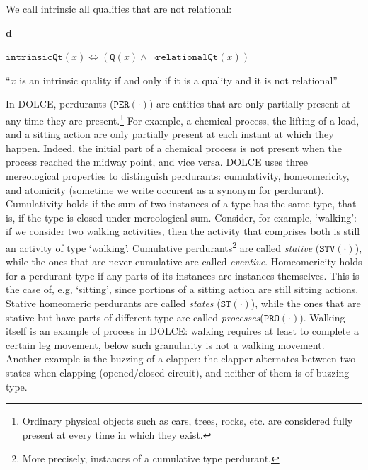 \documentclass[sw]{iosart2x}
\newcommand{\bflist}{\begin{list}{}{\setlength{\topsep}{2mm}\setlength{\partopsep}{0mm}\setlength{\parsep}{0mm}\setlength{\leftmargin}{9mm}\setlength{\labelwidth}{8mm}}}
\newcommand{\eflist}{\end{list}}
\newcommand{\DefLabel}{\textrm{d}}
\newcounter{cntdef}
\newcommand{\mydf}[1]{\refstepcounter{cntdef}\begin{small}{\bf \DefLabel\thecntdef\label{def:#1}}\end{small}}
\newcommand{\mytext}[1]{``#1''}
\newcommand{\generalStyle}[1]{\texttt{#1}}
\newcommand{\uniRel}[2]{\generalStyle{#1}(#2)}
\newcommand{\myiff}{\Longleftrightarrow}
\newcommand{\DOLCE}{\textsc{DOLCE}\xspace} %
\newcommand{\DOLCEQuality}[1]{\uniRel{Q}{#1}}
\newcommand{\DOLCEState}[1]{\uniRel{{ST}}{#1}}
\newcommand{\DOLCEProcess}[1]{\uniRel{PRO}{#1}}
\newcommand{\DOLCEPerdurant}[1]{\uniRel{{PER}}{#1}}
\newcommand{\DOLCEStative}[1]{\uniRel{{STV}}{#1}}
\newcommand{\RelationalQuality}[1]{\uniRel{relationalQt}{#1}}
\newcommand{\IntrinsicQuality}[1]{\uniRel{intrinsicQt}{#1}}
\newcommand{\firstTimeKeyWord}[1]{\textit{#1}}
\newcommand{\quotes}[1]{`#1'}
\begin{document}
We call intrinsic all qualities that are not relational:
\bflist
  \item[\mydf{intrinsicQtPartialDef}] $ \IntrinsicQuality{x} \myiff  ( \DOLCEQuality{x} \land \neg  \RelationalQuality{x})$
  \item[] \mytext{$x$ is an intrinsic quality if and only if it is a quality and it is not relational}
\eflist

In \DOLCE, perdurants ($\DOLCEPerdurant{\cdot}$) are entities that are only partially present at any time they are present.\footnote{Ordinary physical objects such as cars, trees, rocks, etc. are considered fully present at every time in which they exist.} For example, a chemical process, the lifting of a load, and a sitting action are only partially present at each instant at which they happen. Indeed, the initial part of a chemical process is not present when the process reached the midway point, and vice versa.  %
\DOLCE uses three mereological properties to distinguish perdurants: cumulativity, homeomericity, and atomicity (sometime we write occurent as a synonym for perdurant).
Cumulativity holds if the sum of two instances of a type has the same type, that is, if the type is closed under mereological sum. Consider, for example, \quotes{walking}: if we consider two walking activities, then the activity that comprises both is still an activity of type \quotes{walking}.
Cumulative perdurants\footnote{More precisely, instances of a cumulative type perdurant.} are called \firstTimeKeyWord{stative} ($\DOLCEStative{\cdot}$), while the ones that are never cumulative are called \firstTimeKeyWord{eventive}.
Homeomericity holds for a perdurant type if any parts of its instances are instances themselves.
This is the case of, e.g, \quotes{sitting}, since portions of a sitting action are still sitting actions.
Stative homeomeric perdurants are called \firstTimeKeyWord{states} ($\DOLCEState{\cdot}$), while the ones that are stative but have parts of different type are called \firstTimeKeyWord{processes}($\DOLCEProcess{\cdot}$). Walking itself is an example of process in \DOLCE: walking requires at least to complete a certain leg movement, below such granularity is not a walking movement.
Another example is the buzzing of a clapper: the clapper alternates between two states when clapping (opened/closed circuit), and neither of them is of buzzing type.
\end{document}
